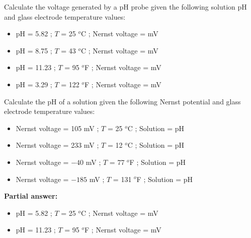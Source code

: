 

Calculate the voltage generated by a pH probe given the following solution pH and glass electrode temperature values:

\begin{itemize}
\item{} pH = 5.82 ; $T$ = 25 $^{o}$C ; Nernst voltage = \underbar{\hskip 50pt} mV
\vskip 5pt
\item{} pH = 8.75 ; $T$ = 43 $^{o}$C ; Nernst voltage = \underbar{\hskip 50pt} mV
\vskip 5pt
\item{} pH = 11.23 ; $T$ = 95 $^{o}$F ; Nernst voltage = \underbar{\hskip 50pt} mV
\vskip 5pt
\item{} pH = 3.29 ; $T$ = 122 $^{o}$F ; Nernst voltage = \underbar{\hskip 50pt} mV
\end{itemize}

\vskip 30pt

Calculate the pH of a solution given the following Nernst potential and glass electrode temperature values:

\begin{itemize}
\item{} Nernst voltage = 105 mV ; $T$ = 25 $^{o}$C ; Solution = \underbar{\hskip 50pt} pH
\vskip 5pt
\item{} Nernst voltage = 233 mV ; $T$ = 12 $^{o}$C ; Solution = \underbar{\hskip 50pt} pH
\vskip 5pt
\item{} Nernst voltage = $-40$ mV ; $T$ = 77 $^{o}$F ; Solution = \underbar{\hskip 50pt} pH
\vskip 5pt
\item{} Nernst voltage = $-185$ mV ; $T$ = 131 $^{o}$F ; Solution = \underbar{\hskip 50pt} pH
\end{itemize}







\noindent
{\bf Partial answer:}

\begin{itemize}
\item{} pH = 5.82 ; $T$ = 25 $^{o}$C ; Nernst voltage =  mV
\vskip 5pt
\item{} pH = 11.23 ; $T$ = 95 $^{o}$F ; Nernst voltage =  mV
\end{itemize}

